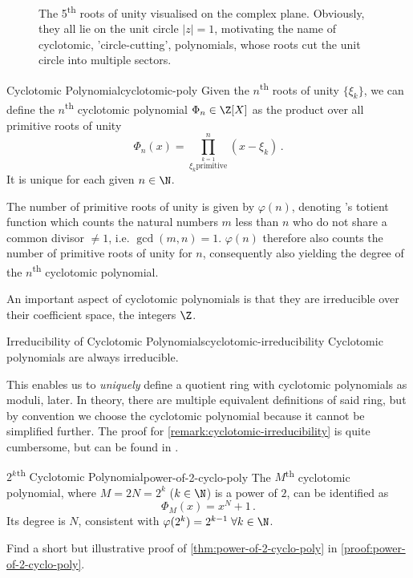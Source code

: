 \begin{figure}
  \centering
  \caption[The 5th roots of unity]{The 5\textsuperscript{th} roots of unity visualised on the complex plane. Obviously, they all lie on the unit circle $|z| = 1$, motivating the name of cyclotomic, 'circle-cutting', polynomials, whose roots cut the unit circle into multiple sectors.}
  \label{fig:nth-roots-of-unity}
\end{figure}

\begin{definition}{Cyclotomic Polynomial}{cyclotomic-poly}
  Given the $n$\textsuperscript{th} roots of unity $\{\xi_k\}$, we can define the $n$\textsuperscript{th}
  cyclotomic polynomial $\Phi_n \in \Z[X]$ as the product over all primitive roots of unity
  $$\Phi_n(x) = \prod_{\stackrel{k=1}{\xi_k \mathrm{primitive}}}^{n} (x - \xi_k) \,.$$
  It is unique for each given $n \in \N$.
\end{definition}
The number of primitive roots of unity is given by $\varphi(n)$, denoting 's totient function which counts the natural numbers $m$ less than $n$ who do not share a common divisor $\neq 1$, i.e. $\gcd(m, n) = 1$.
$\varphi(n)$ therefore also counts the number of primitive roots of unity for $n$, consequently also yielding the degree of the $n$\textsuperscript{th} cyclotomic polynomial.

An important aspect of cyclotomic polynomials is that they are irreducible over their coefficient space, the integers $\Z$.
\begin{remark}{Irreducibility of Cyclotomic Polynomials}{cyclotomic-irreducibility}
  Cyclotomic polynomials are always irreducible.
\end{remark}
This enables us to \textit{uniquely} define a quotient ring with cyclotomic polynomials as moduli, later.
In theory, there are multiple equivalent definitions of said ring, but by convention we choose the cyclotomic polynomial because it cannot be simplified further.
The proof for \cref{remark:cyclotomic-irreducibility} is quite cumbersome, but can be found in \cite{2002-serge-algebra}.

\begin{theorem}{$2^k$\textsuperscript{th} Cyclotomic Polynomial}{power-of-2-cyclo-poly}
  The $M$\textsuperscript{th} cyclotomic polynomial, where $M = 2N = 2^k$ ($k \in \N$) is a power of $2$, can be identified as
  $$\Phi_{M}(x) = x^{N} + 1\,.$$
  Its degree is $N$, consistent with $\varphi(2^k) = 2^{k-1} \; \forall k \in \N$.
\end{theorem}
Find a short but illustrative proof of \cref{thm:power-of-2-cyclo-poly} in \cref{proof:power-of-2-cyclo-poly}.

